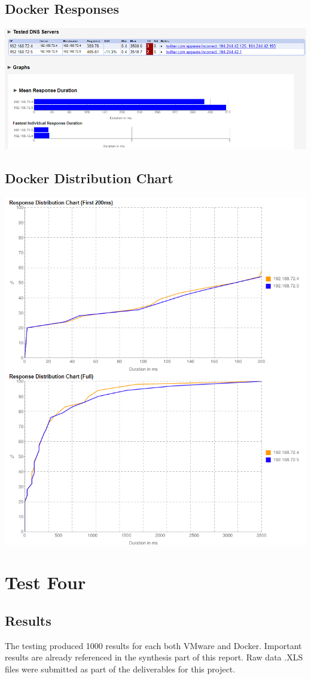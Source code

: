 \documentclass[12pt,twoside]{book}
\begin{document}
\subsection{Docker Responses}
\includegraphics[width=\textwidth]{Appendicies/DockerTest3Result.PNG}
\subsection{Docker Distribution Chart}
\includegraphics[width=\textwidth]{Appendicies/DockerTest3Chart.PNG}

\section{Test Four}
\subsection{Results}
The testing produced 1000 results for each both VMware and Docker. Important results are already referenced in the synthesis part of this report. Raw data .XLS files were submitted as part of the deliverables for this project.
\end{document}
